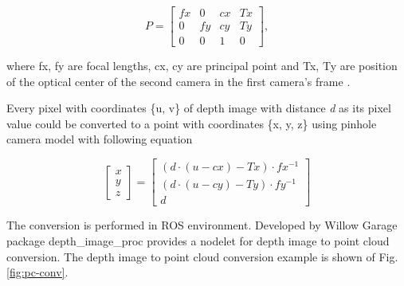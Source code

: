 \documentclass{ctuthesis}
\begin{document}
\[P = \begin{bmatrix}
fx & 0 & cx & Tx\\
0 & fy & cy & Ty\\
0 & 0 & 1 & 0
\end{bmatrix}, \]

where fx, fy are focal lengths, cx, cy are principal point and Tx, Ty are position of the optical center of the second camera in the first camera's frame \cite{ros}.

Every pixel with coordinates \{u, v\} of depth image with distance \emph{d} as its pixel value could be converted to a point with coordinates \{x, y, z\} using pinhole camera model with following equation

\[\begin{bmatrix}
x\\
y\\
z
\end{bmatrix} = \begin{bmatrix}
(d \cdot (u - cx) - Tx) \cdot fx^{-1}\\
(d \cdot (u - cy) - Ty) \cdot fy^{-1}\\
d
\end{bmatrix} \]

The conversion is performed in ROS environment. Developed by Willow Garage package depth\_image\_proc provides a nodelet for depth image to point cloud conversion. The depth image to point cloud conversion example is shown of Fig.\ref{fig:pc-conv}.
\end{document}
